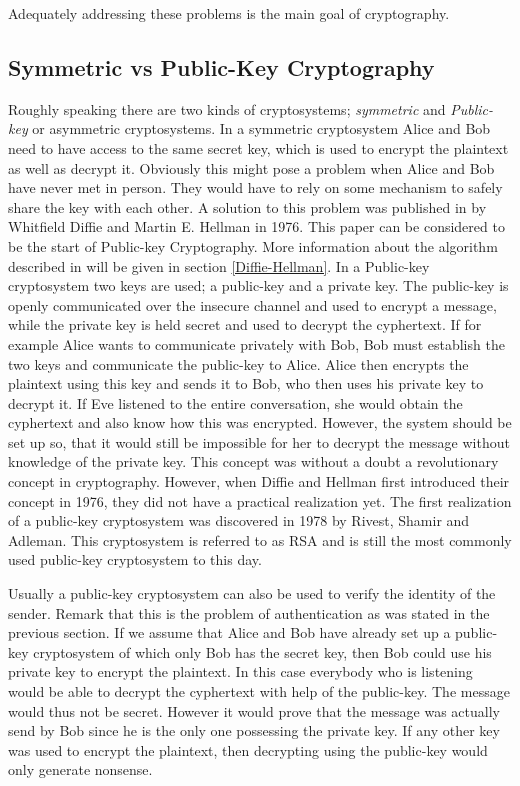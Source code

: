 \documentclass{article}
\numberwithin{equation}{section}
\theoremstyle{definition}
\begin{document}
Adequately addressing these problems is the main goal of cryptography.



\subsection{Symmetric vs Public-Key Cryptography}\label{PkandS}
Roughly speaking there are two kinds of cryptosystems; \emph{symmetric} and \emph{Public-key} or asymmetric cryptosystems. In a symmetric cryptosystem Alice and Bob need to have access to the same secret key, which is used to encrypt the plaintext as well as decrypt it. Obviously this might pose a problem when Alice and Bob have never met in person. They would have to rely on some mechanism to safely share the key with each other. A solution to this problem was published in \cite{DiffieHellman} by Whitfield Diffie and Martin E. Hellman in 1976. This paper can be considered to be the start of Public-key Cryptography. More information about the algorithm described in \cite{DiffieHellman} will be given in section \ref{Diffie-Hellman}. In a Public-key cryptosystem two keys are used; a public-key and a private key. The public-key is openly communicated over the insecure channel and used to encrypt a message, while the private key is held secret and used to decrypt the cyphertext. If for example Alice wants to communicate privately with Bob, Bob must establish the two keys and communicate the public-key to Alice. Alice then encrypts the plaintext using this key and sends it to Bob, who then uses his private key to decrypt it. If Eve listened to the entire conversation, she would obtain the cyphertext and also know how this was encrypted. However, the system should be set up so, that it would still be impossible for her to decrypt the message without knowledge of the private key. This concept was without a doubt a revolutionary concept in cryptography. However, when Diffie and Hellman first introduced their concept in 1976, they did not have a practical realization yet. The first realization of a public-key cryptosystem was discovered in 1978 by Rivest, Shamir and Adleman. This cryptosystem is referred to as RSA and is still the most commonly used public-key cryptosystem to this day.\par
Usually a public-key cryptosystem can also be used to verify the identity of the sender. Remark that this is the problem of authentication as was stated in the previous section. If we assume that Alice and Bob have already set up a public-key cryptosystem of which only Bob has the secret key, then Bob could use his private key to encrypt the plaintext. In this case everybody who is listening would be able to decrypt the cyphertext with help of the public-key. The message would thus not be secret. However it would prove that the message was actually send by Bob since he is the only one possessing the private key. If any other key was used to encrypt the plaintext, then decrypting using the public-key would only generate nonsense.\par 
\end{document}
